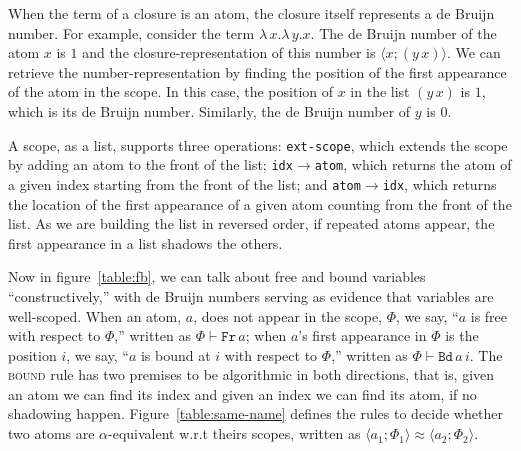 \documentclass[a4paper,UKenglish]{lipics-v2016}
\newcommand{\clos}[2] {
  \langle #1; #2 \rangle
}
\newcommand{\aeq}[4] {
  \clos{#1}{#2} \approx \clos{#3}{#4}
}
\newcommand*{\transname}[1]{\textsc{#1}}
\begin{document}
When the term of a closure is an atom, the closure itself represents a
de Bruijn number.  For example, consider the term
$\lambda\,x.\lambda\,y.x$. The de Bruijn number of the atom $x$ is $1$
and the closure-representation of this number is $\clos{x}{(y\,x)}$.
We can retrieve the number-representation by finding the
position of the first appearance of the atom in the scope. In this
case, the position of $x$ in the list $(y\,x)$ is $1$, which is its de
Bruijn number. Similarly, the de Bruijn number of $y$ is $0$.

A scope, as a list, supports three operations:
\texttt{ext-scope}, which extends the scope by adding an atom to the front of the list;
\texttt{idx$\rightarrow$atom}, which returns the atom of a given index starting from the front of the list;
and \texttt{atom$\rightarrow$idx}, which returns the location of the first appearance of a given atom counting from the front of the list.
As we are building the list in reversed order, if repeated atoms appear, the first appearance in a list shadows the others.

Now in figure~\ref{table:fb}, we can talk about free and bound variables ``constructively,''
with de Bruijn numbers serving as evidence that variables are well-scoped.
When an atom, $a$, does not appear in the scope, $\Phi$,
we say, ``$a$ is free with respect to $\Phi$,'' written as $\Phi \vdash \texttt{Fr}\, a$;
when $a$'s first appearance in $\Phi$ is the position $i$,
we say, ``$a$ is bound at $i$ with respect to $\Phi$,'' written as $\Phi \vdash \texttt{Bd}\, a\,i$.
The \transname{bound} rule has two premises to be algorithmic in both directions,
that is, given an atom we can find its index
and given an index we can find its atom, if no shadowing happen.
Figure~\ref{table:same-name} defines the rules to decide whether two atoms are $\alpha$-equivalent w.r.t theirs scopes,
written as $\aeq{a_1}{\Phi_1}{a_2}{\Phi_2}$.
\end{document}
